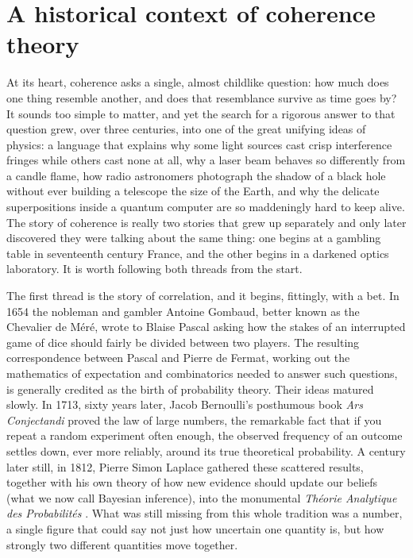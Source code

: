 \section{A historical context of coherence theory}

	At its heart, coherence asks a single, almost childlike question: how much does one
	thing resemble another, and does that resemblance survive as time goes by? It sounds too
	simple to matter, and yet the search for a rigorous answer to that question grew, over
	three centuries, into one of the great unifying ideas of physics: a language that
	explains why some light sources cast crisp interference fringes while others cast none
	at all, why a laser beam behaves so differently from a candle flame, how radio
	astronomers photograph the shadow of a black hole without ever building a telescope the
	size of the Earth, and why the delicate superpositions inside a quantum computer are so
	maddeningly hard to keep alive. The story of coherence is really two stories that grew up
	separately and only later discovered they were talking about the same thing: one begins
	at a gambling table in seventeenth century France, and the other begins in a darkened
	optics laboratory. It is worth following both threads from the start.

	The first thread is the story of correlation, and it begins, fittingly, with a bet.
	In 1654 the nobleman and gambler Antoine Gombaud, better known as the Chevalier de
	Méré, wrote to Blaise Pascal asking how the stakes of an interrupted game of dice should
	fairly be divided between two players. The resulting correspondence between Pascal and
	Pierre de Fermat, working out the mathematics of expectation and combinatorics needed to
	answer such questions, is generally credited as the birth of probability theory. Their
	ideas matured slowly. In 1713, sixty years later, Jacob Bernoulli's posthumous book
	\textit{Ars Conjectandi} \cite{bernoulli1713} proved the law of large numbers, the
	remarkable fact that if you repeat a random experiment often enough, the observed
	frequency of an outcome settles down, ever more reliably, around its true theoretical
	probability. A century later still, in 1812, Pierre Simon Laplace gathered these
	scattered results, together with his own theory of how new evidence should update our
	beliefs (what we now call Bayesian inference), into the monumental
	\textit{Théorie Analytique des Probabilités} \cite{laplace1812theorie}. What was still
	missing from this whole tradition was a number, a single figure that could say not just
	how uncertain one quantity is, but how strongly two different quantities move together.

